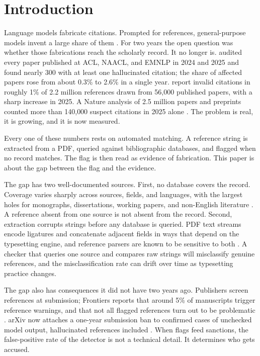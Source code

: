 \documentclass[11pt, a4paper]{article}
\begin{document}
\section{Introduction}
Language models fabricate citations. Prompted for references, general-purpose models invent a large share of them \citep{bhattacharyya2023, walters2023, day2023}. For two years the open question was whether those fabrications reach the scholarly record. It no longer is. \citet{sakai2026} audited every paper published at ACL, NAACL, and EMNLP in 2024 and 2025 and found nearly 300 with at least one hallucinated citation; the share of affected papers rose from about 0.3\% to 2.6\% in a single year. \citet{ghostcite2026} report invalid citations in roughly 1\% of 2.2 million references drawn from 56{,}000 published papers, with a sharp increase in 2025. A Nature analysis of 2.5 million papers and preprints counted more than 140{,}000 suspect citations in 2025 alone \citep{stokelwalker2026}. The problem is real, it is growing, and it is now measured.

Every one of these numbers rests on automated matching. A reference string is extracted from a PDF, queried against bibliographic databases, and flagged when no record matches. The flag is then read as evidence of fabrication. This paper is about the gap between the flag and the evidence.

The gap has two well-documented sources. First, no database covers the record. Coverage varies sharply across sources, fields, and languages, with the largest holes for monographs, dissertations, working papers, and non-English literature \citep{martinmartin2018, visser2021, verabaceta2019}. A reference absent from one source is not absent from the record. Second, extraction corrupts strings before any database is queried. PDF text streams encode ligatures and concatenate adjacent fields in ways that depend on the typesetting engine, and reference parsers are known to be sensitive to both \citep{lopez2009, tkaczyk2018}. A checker that queries one source and compares raw strings will misclassify genuine references, and the misclassification rate can drift over time as typesetting practice changes.

The gap also has consequences it did not have two years ago. Publishers screen references at submission; Frontiers reports that around 5\% of manuscripts trigger reference warnings, and that not all flagged references turn out to be problematic \citep{naddaf2026}. arXiv now attaches a one-year submission ban to confirmed cases of unchecked model output, hallucinated references included \citep{naddaf2026}. When flags feed sanctions, the false-positive rate of the detector is not a technical detail. It determines who gets accused.
\end{document}
